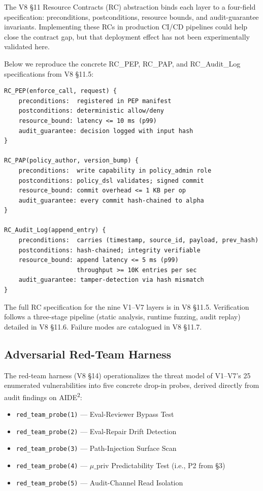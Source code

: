 \documentclass{article}
\theoremstyle{definition}
\begin{document}
The V8 \S11 Resource Contracts (RC) abstraction binds each layer to a four-field specification: preconditions, postconditions, resource bounds, and audit-guarantee invariants. Implementing these RCs in production CI/CD pipelines could help close the contract gap, but that deployment effect has not been experimentally validated here.

Below we reproduce the concrete RC\_PEP, RC\_PAP, and RC\_Audit\_Log specifications from V8 \S11.5:

\begin{verbatim}
RC_PEP(enforce_call, request) {
    preconditions:  registered in PEP manifest
    postconditions: deterministic allow/deny
    resource_bound: latency <= 10 ms (p99)
    audit_guarantee: decision logged with input hash
}

RC_PAP(policy_author, version_bump) {
    preconditions:  write capability in policy_admin role
    postconditions: policy_dsl validates; signed commit
    resource_bound: commit overhead <= 1 KB per op
    audit_guarantee: every commit hash-chained to alpha
}

RC_Audit_Log(append_entry) {
    preconditions:  carries (timestamp, source_id, payload, prev_hash)
    postconditions: hash-chained; integrity verifiable
    resource_bound: append latency <= 5 ms (p99)
                    throughput >= 10K entries per sec
    audit_guarantee: tamper-detection via hash mismatch
}
\end{verbatim}

The full RC specification for the nine V1--V7 layers is in V8 \S11.5. Verification follows a three-stage pipeline (static analysis, runtime fuzzing, audit replay) detailed in V8 \S11.6. Failure modes are catalogued in V8 \S11.7.

\subsection{Adversarial Red-Team Harness}

The red-team harness (V8 \S14) operationalizes the threat model of V1--V7's 25 enumerated vulnerabilities into five concrete drop-in probes, derived directly from audit findings on AIDE\textsuperscript{2}:

\begin{itemize}
    \item \texttt{red\_team\_probe(1)} --- Eval-Reviewer Bypass Test
    \item \texttt{red\_team\_probe(2)} --- Eval-Repair Drift Detection
    \item \texttt{red\_team\_probe(3)} --- Path-Injection Surface Scan
    \item \texttt{red\_team\_probe(4)} --- $\mu\_{\text{priv}}$ Predictability Test (i.e., P2 from \S3)
    \item \texttt{red\_team\_probe(5)} --- Audit-Channel Read Isolation
\end{itemize}
\end{document}
